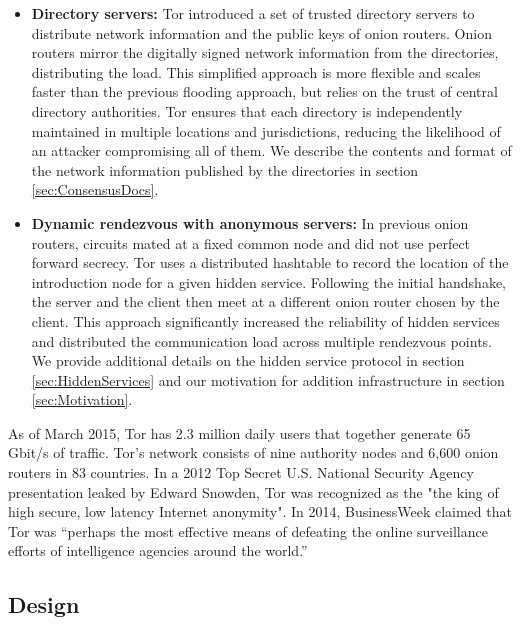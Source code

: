 \begin{itemize}
	\item \textbf{Directory servers:} Tor introduced a set of trusted directory servers to distribute network information and the public keys of onion routers. Onion routers mirror the digitally signed network information from the directories, distributing the load. This simplified approach is more flexible and scales faster than the previous flooding approach, but relies on the trust of central directory authorities. Tor ensures that each directory is independently maintained in multiple locations and jurisdictions, reducing the likelihood of an attacker compromising all of them.\cite{syverson2011peel} We describe the contents and format of the network information published by the directories in section \ref{sec:ConsensusDocs}.
	\item \textbf{Dynamic rendezvous with anonymous servers:} In previous onion routers, circuits mated at a fixed common node and did not use perfect forward secrecy. Tor uses a distributed hashtable to record the location of the introduction node for a given hidden service. Following the initial handshake, the server and the client then meet at a different onion router chosen by the client. This approach significantly increased the reliability of hidden services and distributed the communication load across multiple rendezvous points.\cite{dingledine2004tor} We provide additional details on the hidden service protocol in section \ref{sec:HiddenServices} and our motivation for addition infrastructure in section \ref{sec:Motivation}.
\end{itemize}

As of March 2015, Tor has 2.3 million daily users that together generate 65 Gbit/s of traffic. Tor's network consists of nine authority nodes and 6,600 onion routers in 83 countries.\cite{TorMetrics} In a 2012 Top Secret U.S. National Security Agency presentation leaked by Edward Snowden, Tor was recognized as the "the king of high secure, low latency Internet anonymity".\cite{landau2014highlights}\cite{plak2014anonymous} In 2014, BusinessWeek claimed that Tor was ``perhaps the most effective means of defeating the online surveillance efforts of intelligence agencies around the world.''\cite{TorBusinessWeek}

\subsection{Design}

